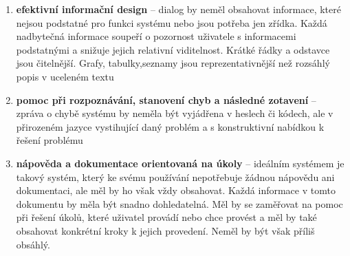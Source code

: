 \begin{enumerate}
\item \textbf{efektivní informační design} – dialog by neměl obsahovat informace, které nejsou podstatné pro funkci systému nebo jsou potřeba jen zřídka. Každá nadbytečná informace soupeří o pozornost uživatele s informacemi podstatnými a snižuje jejich relativní viditelnost. Krátké řádky a odstavce jsou čitelnější. Grafy, tabulky,seznamy jsou reprezentativnější než rozsáhlý popis v uceleném textu\cite{thesis:flamik} 

\item \textbf{pomoc při rozpoznávání, stanovení chyb a následné zotavení} – zpráva o chybě systému by neměla být vyjádřena v heslech či kódech, ale v přirozeném jazyce vystihující daný problém a s konstruktivní nabídkou k řešení problému\cite{thesis:flamik} 

\item \textbf{nápověda a dokumentace orientovaná na úkoly} – ideálním systémem je takový systém, který ke svému používání nepotřebuje žádnou nápovědu ani dokumentaci, ale měl by ho však vždy obsahovat. Každá informace v tomto dokumentu by měla být snadno dohledatelná. Měl by se zaměřovat na pomoc při řešení úkolů, které uživatel provádí nebo chce provést a měl by také obsahovat konkrétní kroky k jejich provedení. Neměl by být však příliš obsáhlý.\cite{thesis:flamik}

\end{enumerate}